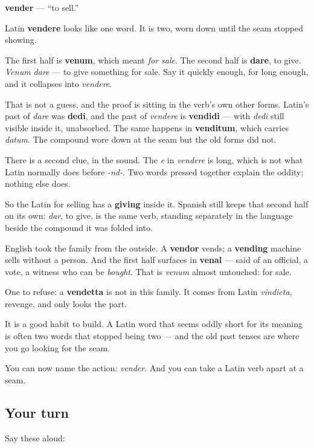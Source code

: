 \begin{cousinweb}
\textbf{vender} — \textquotedblleft{}to sell.\textquotedblright{}

Latin \textbf{vendere} looks like one word. It is two, worn down until the seam stopped showing.

The first half is \textbf{venum}, which meant \emph{for sale}. The second half is \textbf{dare}, to give. \emph{Venum dare} — to give something for sale. Say it quickly enough, for long enough, and it collapses into \emph{vendere}.

That is not a guess, and the proof is sitting in the verb's own other forms. Latin's past of \emph{dare} was \textbf{dedi}, and the past of \emph{vendere} is \textbf{vendidi} — with \emph{dedi} still visible inside it, unabsorbed. The same happens in \textbf{venditum}, which carries \emph{datum}. The compound wore down at the seam but the old forms did not.

There is a second clue, in the sound. The \emph{e} in \emph{vendere} is long, which is not what Latin normally does before \emph{-nd-}. Two words pressed together explain the oddity; nothing else does.

So the Latin for selling has a \textbf{giving} inside it. Spanish still keeps that second half on its own: \emph{dar}, to give, is the same verb, standing separately in the language beside the compound it was folded into.

English took the family from the outside. A \textbf{vendor} vends; a \textbf{vending} machine sells without a person. And the first half surfaces in \textbf{venal} — said of an official, a vote, a witness who can be \emph{bought}. That is \emph{venum} almost untouched: for sale.

One to refuse: a \textbf{vendetta} is not in this family. It comes from Latin \emph{vindicta}, revenge, and only looks the part.

It is a good habit to build. A Latin word that seems oddly short for its meaning is often two words that stopped being two — and the old past tenses are where you go looking for the seam.
\end{cousinweb}

\begin{grammarlens}[title={What you've built}]
You can now name the action: \emph{vender}. And you can take a Latin verb apart at a seam.
\end{grammarlens}

\subsection*{Your turn}
Say these aloud:

